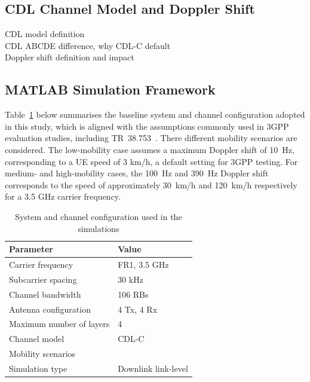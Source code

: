 \documentclass[a4paper,12pt,onecolumn]{article}
\begin{document}
\subsection{CDL Channel Model and Doppler Shift}
	CDL model definition\\
	CDL ABCDE difference, why CDL-C default\\
	Doppler shift definition and impact
	\newpage
	
	
	
\subsection{MATLAB Simulation Framework}
	\begin{highlightblock}
		Table~\ref{tab:system_config} below summarises the baseline system and channel configuration adopted in this study, which is aligned with the assumptions commonly used in 3GPP evaluation studies, including TR~38.753~\cite{3GPPSimulationSpec}. There different mobility scenarios are considered. The low-mobility case assumes a maximum Doppler shift of 10~Hz, corresponding to a UE speed of 3 km/h, a default setting for 3GPP testing. For medium- and high-mobility cases, the 100~Hz and 390~Hz Doppler shift corresponds to the speed of approximately 30~km/h and 120~km/h respectively for a 3.5 GHz carrier frequency.
	\end{highlightblock}

		
		\begin{table}[H]
			\centering
			\caption{System and channel configuration used in the simulations}
			\label{tab:system_config}
			\begin{tabular}{ll}
				\hline
				\textbf{Parameter} & \textbf{Value} \\
				\toprule
				Carrier frequency      & FR1, 3.5 GHz \\
				Subcarrier spacing          & 30 kHz \\
				Channel bandwidth           & 106 RBs \\
				Antenna configuration       & 4 Tx, 4 Rx \\
				Maximum number of layers    & 4 \\
				Channel model               & CDL-C \\
				Mobility scenarios          & \makecell[l]{10~Hz (Default), 100~Hz, 390~Hz}\\
				Simulation type             & Downlink link-level \\
				\hline
			\end{tabular}
		\end{table}
		
\end{document}
